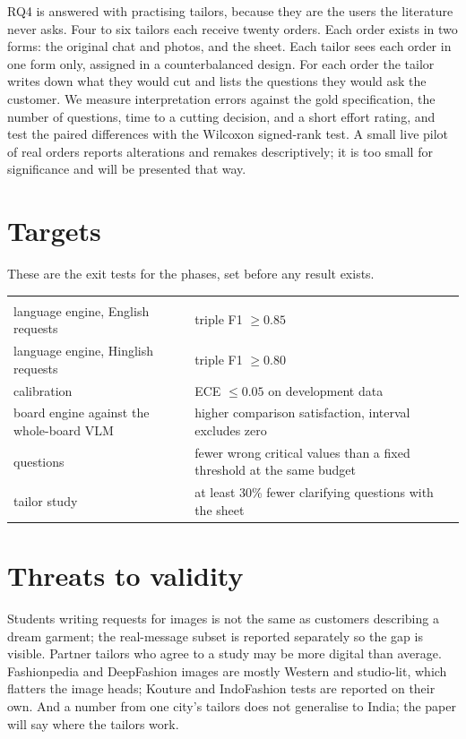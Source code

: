 RQ4 is answered with practising tailors, because they are the users the literature never asks. Four to six tailors each receive twenty orders. Each order exists in two forms: the original chat and photos, and the \sys{} sheet. Each tailor sees each order in one form only, assigned in a counterbalanced design. For each order the tailor writes down what they would cut and lists the questions they would ask the customer. We measure interpretation errors against the gold specification, the number of questions, time to a cutting decision, and a short effort rating, and test the paired differences with the Wilcoxon signed-rank test. A small live pilot of real orders reports alterations and remakes descriptively; it is too small for significance and will be presented that way.

\section{Targets}

These are the exit tests for the phases, set before any result exists.

\begin{table}[h]
\centering\small
\begin{tabularx}{\textwidth}{@{}LP{5.6cm}@{}}
 & \\
language engine, English requests & triple F1 $\ge 0.85$\\
language engine, Hinglish requests & triple F1 $\ge 0.80$\\
calibration & ECE $\le 0.05$ on development data\\
board engine against the whole-board VLM & higher comparison satisfaction, interval excludes zero\\
questions & fewer wrong critical values than a fixed threshold at the same budget\\
tailor study & at least 30\% fewer clarifying questions with the sheet\\
\end{tabularx}
\end{table}

\section{Threats to validity}

Students writing requests for images is not the same as customers describing a dream garment; the real-message subset is reported separately so the gap is visible. Partner tailors who agree to a study may be more digital than average. Fashionpedia and DeepFashion images are mostly Western and studio-lit, which flatters the image heads; Kouture and IndoFashion tests are reported on their own. And a number from one city's tailors does not generalise to India; the paper will say where the tailors work.

